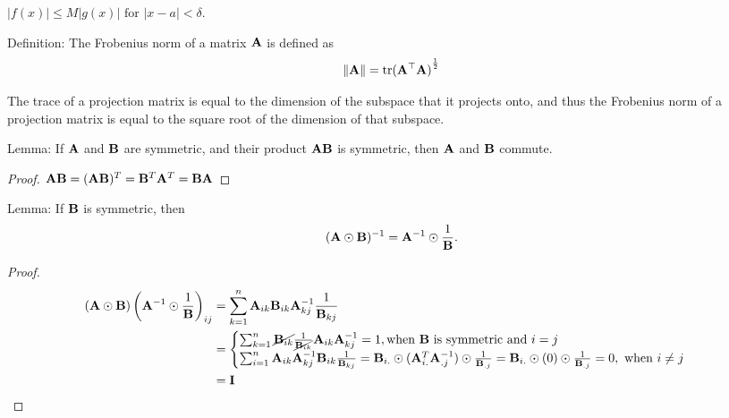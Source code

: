 \documentclass{amsart}[12pt]
\begin{document}
$|f(x)| \leq M |g(x)| \text{ for } |x - a| < \delta$.

Definition:
The Frobenius norm of a matrix ${\bf A}$ is defined as
\begin{align*}
\| {\bf A} \| = \text{tr}{({\bf A}^\top {\bf A})}^{\frac{1}{2}}
\end{align*}

The trace of a projection matrix is equal to the dimension of the subspace that it projects onto, and thus
the Frobenius norm of a projection matrix is equal to the square root of the dimension of that subspace.

Lemma:
If ${\bf A}$ and ${\bf B}$ are symmetric, and their product ${\bf A} {\bf B}$ is symmetric, then ${\bf A}$ and ${\bf B}$ commute.
\begin{proof}
${\bf A} {\bf B} = ({\bf A} {\bf B})^T = {\bf B}^T {\bf A}^T = {\bf B} {\bf A}$
\end{proof}

Lemma:
If ${\bf B}$ is symmetric, then
\[
({\bf A} \odot {\bf B})^{-1} = {\bf A}^{-1} \odot \frac{1}{{\bf B}}.
\]
\begin{proof}
\begin{align*}
({\bf A} \odot {\bf B})\left({\bf A}^{-1} \odot \frac{1}{{\bf B}}\right)_{ij} &= \sum_{k=1}^n {\bf A}_{ik} {\bf B}_{ik} {\bf A}^{-1}_{kj} \frac{1}{{\bf B}_{kj}} \\
&=
\begin{cases}
\sum_{k=1}^n \cancel{{\bf B}_{ik}} \frac{1}{\cancel{{\bf B}_{ik}}} {\bf A}_{ik} {\bf A}^{-1}_{kj} = 1, \text{when ${\bf B}$ is symmetric and $i = j$} \\
\sum_{i=1}^n {\bf A}_{ik} {\bf A}^{-1}_{kj} {\bf B}_{ik} \frac{1}{{\bf B}_{kj}}
= {\bf B}_{i.} \odot ({\bf A}^T_{i.} {\bf A}^{-1}_{.j}) \odot \frac{1}{{\bf B}_{.j}}
= {\bf B}_{i.} \odot (0) \odot \frac{1}{{\bf B}_{.j}}
= 0, \text{ when $i \ne j$}
\end{cases}\\
&= {\bf I}
\end{align*}
\end{proof}
\end{document}

